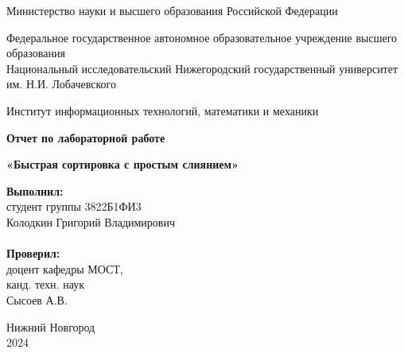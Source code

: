 \documentclass{report}
\begin{document}
\begin{titlepage}

\begin{center}
Министерство науки и высшего образования Российской Федерации
\end{center}

\begin{center}
Федеральное государственное автономное образовательное учреждение высшего образования \\
Национальный исследовательский Нижегородский государственный университет им. Н.И. Лобачевского
\end{center}

\begin{center}
Институт информационных технологий, математики и механики
\end{center}

\vspace{4em}

\begin{center}
\textbf{\Large Отчет по лабораторной работе} \\
\end{center}
\begin{center}
\textbf{\Large «Быстрая сортировка с простым слиянием»} \\
\end{center}

\vspace{4em}

\newbox{\lbox}
\newlength{\maxl}
\setlength{\maxl}{\wd\lbox}
\hfill\parbox{7cm}{
\hspace*{5cm}\hspace*{-5cm}\textbf{Выполнил:} \\ студент группы 3822Б1ФИ3 \\ Колодкин Григорий Владимирович\\
\\
\hspace*{5cm}\hspace*{-5cm}\textbf{Проверил:}\\ доцент кафедры МОСТ, \\ канд. техн. наук \\ Сысоев А.В.\\}
\vspace{\fill}

\begin{center} Нижний Новгород \\ 2024 \end{center}

\end{titlepage}
\end{document}
